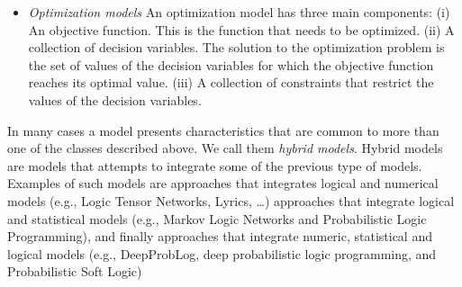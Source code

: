 \begin{itemize}
\item \emph{Optimization models} An optimization model has three main
  components: (i) An objective function. This is the function that
  needs to be optimized. (ii) A collection of decision variables. The
  solution to the optimization problem is the set of values of the
  decision variables for which the objective function reaches its
  optimal value. (iii) A collection of constraints that restrict the
  values of the decision variables.

\end{itemize}

In many cases a model presents characteristics that are common to
more than one of the classes described above. We call them \emph{hybrid
  models}. Hybrid models are models that attempts to integrate some of
the previous type of models. Examples of such models are approaches
that integrates logical and numerical models (e.g., Logic Tensor
Networks, Lyrics, \dots) approaches that integrate logical and
statistical models (e.g., Markov Logic Networks and Probabilistic
Logic Programming), and finally approaches that integrate numeric,
statistical and logical models (e.g., DeepProbLog, deep probabilistic
logic programming, and Probabilistic Soft Logic)

